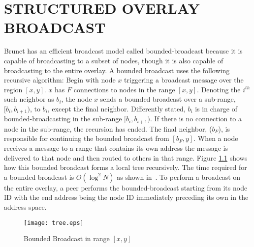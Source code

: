 %

{\chapter{STRUCTURED OVERLAY BROADCAST}
\label{broadcast}}


Brunet has an efficient broadcast model called bounded-broadcast because it is
capable of broadcasting to a subset of nodes, though it is also capable of
broadcasting to the entire overlay.  A bounded broadcast uses the following
recursive algorithm:  Begin with node $x$ triggering a broadcast message over
the region $[x, y]$.  $x$ has $F$ connections to nodes in the range $[x, y]$.
Denoting the $i^{th}$ such neighbor as $b_i$, the node $x$ sends a bounded
broadcast over a sub-range, $[b_i, b_{i+1})$, to $b_i$, except the final
neighbor.  Differently stated, $b_i$ is in charge of bounded-broadcasting 
in the sub-range $[b_i, b_{i+1})$. If there is no connection to a node in the
sub-range, the recursion has ended.  The final neighbor, ($b_F$), is responsible
for continuing the bounded broadcast from $[b_F, y]$.  When a node receives a
message to a range that contains its own address the message is delivered to
that node and then routed to others in that range.  Figure \ref{fig:tree} shows
how this bounded broadcast forms a local tree recursively.   The time required
for a bounded broadcast is $O(\log^2 N)$ as shown in~\cite{small_world}.  To
perform a broadcast on the entire overlay, a peer performs the bounded-broadcast
starting from its node ID with the end address being the node ID immediately
preceding its own in the address space.  

\begin{figure}[ht]
\centering
\texttt{[image: tree.eps]}
\caption{Bounded Broadcast in range $[x, y]$}
\label{fig:tree}
\end{figure}
